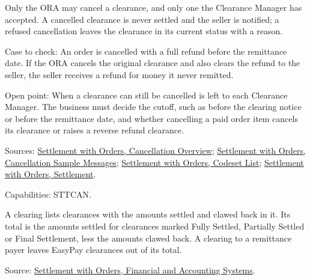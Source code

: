 \begin{definition}
  \label{def:accounting-clearance-cancellation}
  \notready
  Only the ORA may cancel a clearance, and only one the Clearance Manager
  has accepted. A cancelled clearance is never settled and the seller is
  notified; a refused cancellation leaves the clearance in its current
  status with a reason.

  Case to check: An order is cancelled with a full refund before the
  remittance date. If the ORA cancels the original clearance and also clears
  the refund to the seller, the seller receives a refund for money it never
  remitted.

  Open point: When a clearance can still be cancelled is left to each
  Clearance Manager. The business must decide the cutoff, such as before the
  clearing notice or before the remittance date, and whether cancelling a
  paid order item cancels its clearance or raises a reverse refund
  clearance.

  Sources: \href{https://standards.atlassian.net/wiki/spaces/SWO/pages/574587124}{Settlement with Orders, Cancellation Overview};
  \href{https://standards.atlassian.net/wiki/spaces/SWO/pages/574685428}{Settlement with Orders, Cancellation Sample Messages};
  \href{https://standards.atlassian.net/wiki/spaces/SWO/pages/574456090}{Settlement with Orders, Codeset List};
  \href{https://standards.atlassian.net/wiki/spaces/SWO/pages/574816478}{Settlement with Orders, Settlement}.

  Capabilities: STTCAN.
\end{definition}

\begin{definition}
  \label{def:accounting-clearing-total}
  A clearing lists clearances with the amounts settled and clawed back in
  it.  Its total is the amounts settled for clearances marked Fully
  Settled, Partially Settled or Final Settlement, less the amounts clawed
  back.  A clearing to a remittance payer leaves EasyPay clearances out of
  its total.

  Source: \href{https://standards.atlassian.net/wiki/spaces/SWO/pages/574554300}{Settlement with Orders, Financial and Accounting Systems}.
\end{definition}

